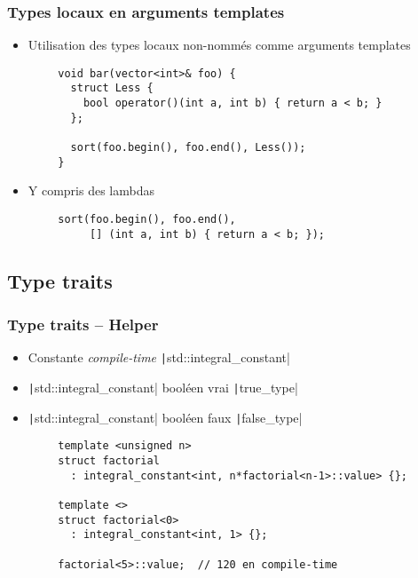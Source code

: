 \documentclass[C++.tex]{subfiles}
\begin{document}
\begin{frame}[fragile]
	\frametitle{Types locaux en arguments templates}
	\begin{itemize}
		\item Utilisation des types locaux non-nommés comme arguments templates
	\end{itemize}

	\begin{verbatim}
		void bar(vector<int>& foo) {
		  struct Less {
		    bool operator()(int a, int b) { return a < b; }
		  };

		  sort(foo.begin(), foo.end(), Less());
		}
	\end{verbatim}

	\begin{itemize}
		\item Y compris des lambdas
	\end{itemize}

	\begin{verbatim}
		sort(foo.begin(), foo.end(),
		     [] (int a, int b) { return a < b; });
 	\end{verbatim}
\end{frame}

\subsection*{Type traits}
\begin{frame}[fragile]
	\frametitle{Type traits -- Helper}
	\begin{itemize}
		\item Constante \textit{compile-time} \texttt|std::integral_constant|
		\item \texttt|std::integral_constant| booléen vrai \texttt|true_type|
		\item \texttt|std::integral_constant| booléen faux \texttt|false_type|
	\end{itemize}

	\begin{verbatim}
		template <unsigned n>
		struct factorial 
		  : integral_constant<int, n*factorial<n-1>::value> {};

		template <>
		struct factorial<0> 
		  : integral_constant<int, 1> {};

		factorial<5>::value;  // 120 en compile-time
	\end{verbatim}
\end{frame}
\end{document}

